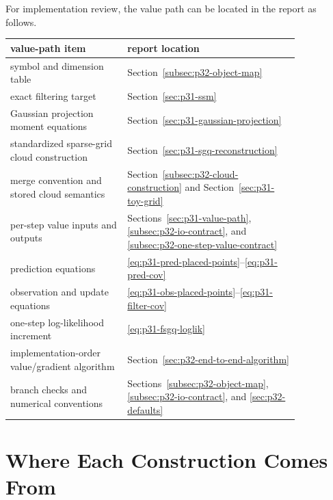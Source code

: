 \documentclass[11pt]{article}
\numberwithin{equation}{section}
\begin{document}
For implementation review, the value path can be located in the report as
follows.
\begin{center}
\small
\begin{tabular}{p{0.34\linewidth}p{0.50\linewidth}}
\toprule
value-path item & report location \\
\midrule
symbol and dimension table & Section~\ref{subsec:p32-object-map} \\
exact filtering target & Section~\ref{sec:p31-ssm} \\
Gaussian projection moment equations & Section~\ref{sec:p31-gaussian-projection} \\
standardized sparse-grid cloud construction & Section~\ref{sec:p31-sgq-reconstruction} \\
merge convention and stored cloud semantics & Section~\ref{subsec:p32-cloud-construction} and Section~\ref{sec:p31-toy-grid} \\
per-step value inputs and outputs & Sections~\ref{sec:p31-value-path}, \ref{subsec:p32-io-contract}, and \ref{subsec:p32-one-step-value-contract} \\
prediction equations & \eqref{eq:p31-pred-placed-points}--\eqref{eq:p31-pred-cov} \\
observation and update equations & \eqref{eq:p31-obs-placed-points}--\eqref{eq:p31-filter-cov} \\
one-step log-likelihood increment & \eqref{eq:p31-fsgq-loglik} \\
implementation-order value/gradient algorithm & Section~\ref{sec:p32-end-to-end-algorithm} \\
branch checks and numerical conventions & Sections~\ref{subsec:p32-object-map}, \ref{subsec:p32-io-contract}, and \ref{sec:p32-defaults} \\
\bottomrule
\end{tabular}
\end{center}

\section{Where Each Construction Comes From}
\label{sec:p31-source-map}
\end{document}
